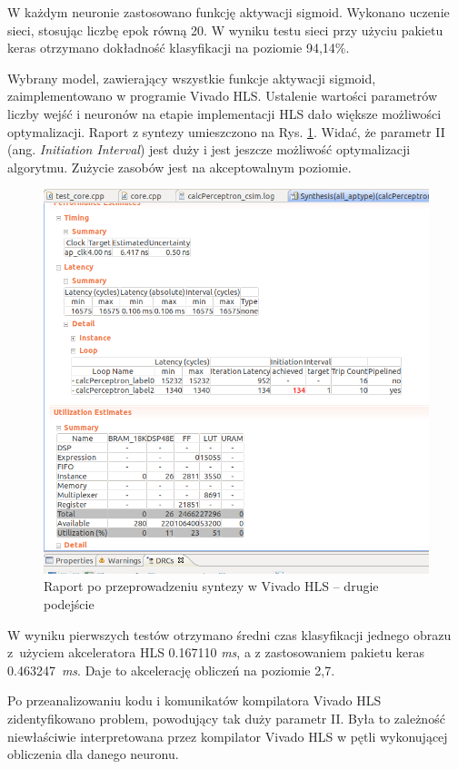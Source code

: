 W każdym neuronie zastosowano funkcję aktywacji sigmoid. Wykonano uczenie sieci, stosując liczbę epok równą 20.
W wyniku testu sieci przy użyciu pakietu keras otrzymano dokładność klasyfikacji na poziomie 94,14\%.

Wybrany model, zawierający wszystkie funkcje aktywacji sigmoid, zaimplementowano w programie Vivado HLS. Ustalenie wartości parametrów liczby wejść i neuronów na etapie implementacji HLS dało większe możliwości optymalizacji. Raport z syntezy umieszczono na Rys. \ref{hls-report2}. Widać, że parametr II (ang. \emph{Initiation Interval}) jest duży i jest jeszcze możliwość optymalizacji algorytmu. Zużycie zasobów jest na akceptowalnym poziomie.

\begin{figure}[!h]
  \centering
  \includegraphics[width=\textwidth]{img/hls-report2.png}
  \caption{Raport po przeprowadzeniu syntezy w Vivado HLS -- drugie podejście}
  \label{hls-report2}
\end{figure}

W wyniku pierwszych testów otrzymano średni czas klasyfikacji jednego obrazu z~użyciem akceleratora HLS 
0.167110 \emph{ms}, a z zastosowaniem pakietu keras 0.463247~\emph{ms}. Daje to akcelerację obliczeń na 
poziomie 2,7.

Po przeanalizowaniu kodu i komunikatów kompilatora Vivado HLS zidentyfikowano problem, powodujący tak duży parametr II. Była to zależność niewłaściwie interpretowana przez kompilator Vivado HLS w pętli wykonującej obliczenia dla danego neuronu.

